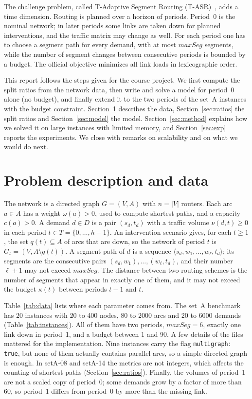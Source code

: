 \documentclass[11pt,a4paper]{article}
\newcommand{\maxseg}{\mathit{maxSeg}}
\begin{document}
The challenge problem, called T-Adaptive Segment Routing (T-ASR)~\cite{orange2026}, adds a time
dimension. Routing is planned over a horizon of periods. Period~0 is the nominal network; in later
periods some links are taken down for planned interventions, and the traffic matrix may change as
well. For each period one has to choose a segment path for every demand, with at most $\maxseg$
segments, while the number of segment changes between consecutive periods is bounded by a budget.
The official objective minimizes all link loads in lexicographic order.

This report follows the steps given for the course project. We first compute the split ratios from
the network data, then write and solve a model for period~0 alone (no budget), and finally extend
it to the two periods of the set~A instances with the budget constraint. Section~\ref{sec:problem}
describes the data, Section~\ref{sec:ratios} the split ratios and Section~\ref{sec:model} the model.
Section~\ref{sec:method} explains how we solved it on large instances with limited memory, and
Section~\ref{sec:exp} reports the experiments. We close with remarks on scalability and on what we
would do next.

\section{Problem description and data}\label{sec:problem}

The network is a directed graph $G=(V,A)$ with $n=|V|$ routers. Each arc $a\in A$ has a weight
$\omega(a)>0$, used to compute shortest paths, and a capacity $c(a)>0$. A demand $d\in D$ is a pair
$(s_d,t_d)$ with a traffic volume $\nu(d,t)\ge 0$ in each period $t\in T=\{0,\dots,h-1\}$. An
intervention scenario gives, for each $t\ge 1$, the set $q(t)\subseteq A$ of arcs that are down, so
the network of period $t$ is $G_t=(V,A\setminus q(t))$. A segment path of $d$ is a sequence
$\langle s_d,w_1,\dots,w_\ell,t_d\rangle$; its segments are the consecutive pairs $(s_d,w_1),
\dots,(w_\ell,t_d)$, and their number $\ell+1$ may not exceed $\maxseg$. The distance between two
routing schemes is the number of segments that appear in exactly one of them, and it may not
exceed the budget $\kappa(t)$ between periods $t-1$ and $t$.

Table~\ref{tab:data} lists where each parameter comes from. The set~A benchmark has 20 instances
with 20 to 400 nodes, 80 to 2000 arcs and 20 to 6000 demands (Table~\ref{tab:instances}). All of
them have two periods, $\maxseg=6$, exactly one link down in period~1, and a budget between 1 and
90. A few details of the files mattered for the implementation. Nine instances carry the flag
\texttt{multigraph: true}, but none of them actually contains parallel arcs, so a simple directed
graph is enough. In setA-08 and setA-14 the metrics are not integers, which affects the counting of
shortest paths (Section~\ref{sec:ratios}). Finally, the volumes of period~1 are not a scaled copy of
period~0; some demands grow by a factor of more than 60, so period~1 differs from period~0 by more than the
missing link.
\end{document}
